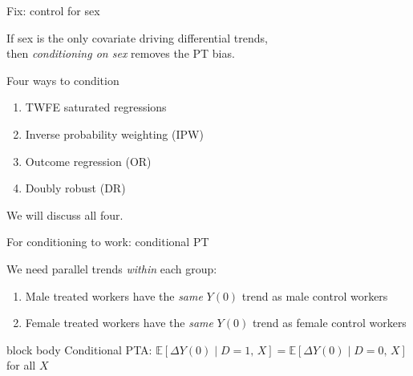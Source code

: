 \documentclass[aspectratio=169,11pt]{beamer}
\newcommand{\emphbox}[1]{%
  \begin{beamercolorbox}[rounded=true,sep=7pt,wd=\linewidth]{block body}%
    \small\color{slate} #1%
  \end{beamercolorbox}}
\begin{document}
\begin{frame}{Fix: control for sex}
\vspace{0.6em}
\begin{center}
If sex is the only covariate driving differential trends,\\
then \emph{conditioning on sex} removes the PT bias.
\end{center}
\end{frame}

\begin{frame}{Four ways to condition}
\vspace{1.2em}
\begin{enumerate}\setlength\itemsep{0.9em}\large
  \item TWFE saturated regressions
  \item Inverse probability weighting (IPW)
  \item Outcome regression (OR)
  \item Doubly robust (DR)
\end{enumerate}
\vspace{1em}
\begin{center}\color{warmgray}
We will discuss all four.
\end{center}
\end{frame}

\begin{frame}{For conditioning to work: conditional PT}
\vspace{0.6em}
\begin{center}
We need parallel trends \emph{within} each group:
\end{center}
\vspace{0.4em}
\begin{enumerate}\setlength\itemsep{0.5em}
  \item Male treated workers have the \emph{same} $Y(0)$ trend as male control workers
  \item Female treated workers have the \emph{same} $Y(0)$ trend as female control workers
\end{enumerate}
\vspace{0.6em}
\emphbox{Conditional PTA: \;\;
$\mathbb{E}[\Delta Y(0)\mid D{=}1,\,X] = \mathbb{E}[\Delta Y(0)\mid D{=}0,\,X]$
\quad for all $X$}
\end{frame}

\end{document}
